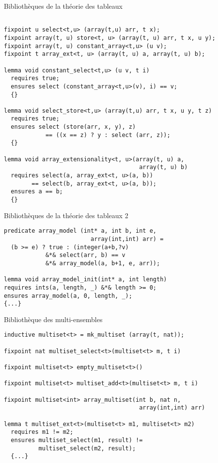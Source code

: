 \documentclass[]{beamer}
\begin{document}
\begin{frame}[fragile]{Biblioth\`eques de la th\'eorie des tableaux}

			\begin{lstlisting}[basicstyle=\footnotesize]
			
fixpoint u select<t,u> (array(t,u) arr, t x);
fixpoint array(t, u) store<t, u> (array(t, u) arr, t x, u y);
fixpoint array(t, u) constant_array<t,u> (u v);
fixpoint t array_ext<t, u> (array(t, u) a, array(t, u) b);

lemma void constant_select<t,u> (u v, t i)
  requires true;
  ensures select (constant_array<t,u>(v), i) == v;
  {}
  
lemma void select_store<t,u> (array(t,u) arr, t x, u y, t z)
  requires true;
  ensures select (store(arr, x, y), z) 
    		== ((x == z) ? y : select (arr, z));
  {}
    		
lemma void array_extensionality<t, u>(array(t, u) a,
                                       array(t, u) b)
  requires select(a, array_ext<t, u>(a, b)) 
		== select(b, array_ext<t, u>(a, b));
  ensures a == b;
  {}
			\end{lstlisting}
\end{frame}

\begin{frame}[fragile]{Biblioth\`eques de la th\'eorie des tableaux 2}

			\begin{lstlisting}[basicstyle=\footnotesize]
predicate array_model (int* a, int b, int e,
                         array(int,int) arr) =
  (b >= e) ? true : (integer(a+b,?v) 
            &*& select(arr, b) == v 
            &*& array_model(a, b+1, e, arr));
  			
lemma void array_model_init(int* a, int length)
requires ints(a, length, _) &*& length >= 0;
ensures array_model(a, 0, length, _);
{...}

			\end{lstlisting}
\end{frame}

\begin{frame}[fragile]{Biblioth\`eque des multi-ensembles}
	
			\begin{lstlisting}[basicstyle=\footnotesize]
inductive multiset<t> = mk_multiset (array(t, nat));
  
fixpoint nat multiset_select<t>(multiset<t> m, t i)

fixpoint multiset<t> empty_multiset<t>()

fixpoint multiset<t> multiset_add<t>(multiset<t> m, t i)

fixpoint multiset<int> array_multiset(int b, nat n,
                                       array(int,int) arr) 

lemma t multiset_ext<t>(multiset<t> m1, multiset<t> m2)
  requires m1 != m2;
  ensures multiset_select(m1, result) !=
          multiset_select(m2, result);
  {...}
			\end{lstlisting}
			
			
\end{frame}
\end{document}
